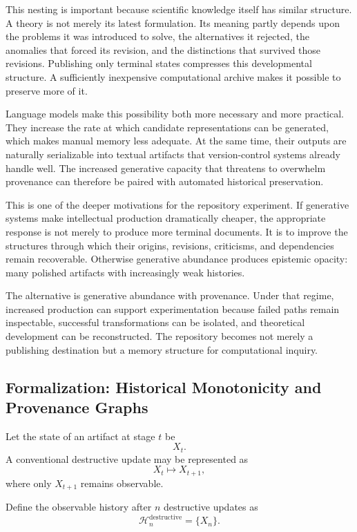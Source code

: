 \documentclass[11pt]{article}
\begin{document}
This nesting is important because scientific knowledge itself has similar structure. A theory is not merely its latest formulation. Its meaning partly depends upon the problems it was introduced to solve, the alternatives it rejected, the anomalies that forced its revision, and the distinctions that survived those revisions. Publishing only terminal states compresses this developmental structure. A sufficiently inexpensive computational archive makes it possible to preserve more of it.

Language models make this possibility both more necessary and more practical. They increase the rate at which candidate representations can be generated, which makes manual memory less adequate. At the same time, their outputs are naturally serializable into textual artifacts that version-control systems already handle well. The increased generative capacity that threatens to overwhelm provenance can therefore be paired with automated historical preservation.

This is one of the deeper motivations for the repository experiment. If generative systems make intellectual production dramatically cheaper, the appropriate response is not merely to produce more terminal documents. It is to improve the structures through which their origins, revisions, criticisms, and dependencies remain recoverable. Otherwise generative abundance produces epistemic opacity: many polished artifacts with increasingly weak histories.

The alternative is generative abundance with provenance. Under that regime, increased production can support experimentation because failed paths remain inspectable, successful transformations can be isolated, and theoretical development can be reconstructed. The repository becomes not merely a publishing destination but a memory structure for computational inquiry.

\subsection{Formalization: Historical Monotonicity and Provenance Graphs}

Let the state of an artifact at stage \(t\) be
\[
    X_t.
\]
A conventional destructive update may be represented as
\[
    X_t\mapsto X_{t+1},
\]
where only \(X_{t+1}\) remains observable.

Define the observable history after \(n\) destructive updates as
\[
    \mathcal{H}^{\mathrm{destructive}}_n
    =
    \{X_n\}.
\]
\end{document}
